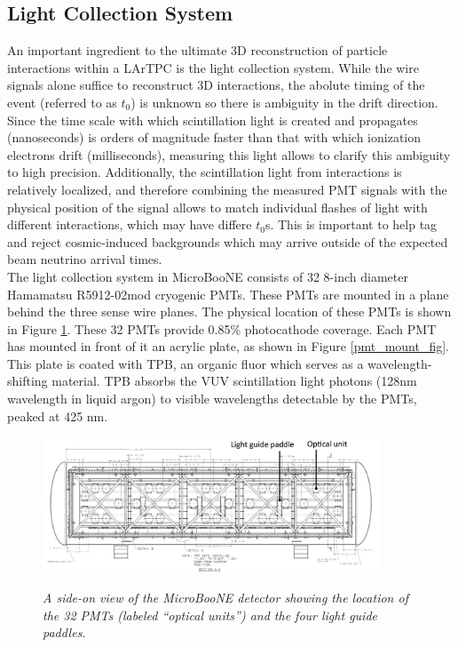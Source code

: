 \subsection{Light Collection System}
An important ingredient to the ultimate 3D reconstruction of particle interactions within a LArTPC is the light collection system. While the wire signals alone suffice to reconstruct 3D interactions, the abolute timing of the event (referred to as $t_0$) is unknown so there is ambiguity in the drift direction. Since the time scale with which scintillation light is created and propagates (nanoseconds) is orders of magnitude faster than that with which ionization electrons drift (milliseconds), measuring this light allows to clarify this ambiguity to high precision. Additionally, the scintillation light from interactions is relatively localized, and therefore combining the measured PMT signals with the physical position of the signal allows to match individual flashes of light with different interactions, which may have differe $t_0$s. This is important to help tag and reject cosmic-induced backgrounds which may arrive outside of the expected beam neutrino arrival times.\\

The light collection system in MicroBooNE consists of 32 8-inch diameter Hamamatsu R5912-02mod cryogenic PMTs. These PMTs are mounted in a plane behind the three sense wire planes. The physical location of these PMTs is shown in Figure \ref{pmt_placement_fig}. These 32 PMTs provide 0.85\% photocathode coverage. Each PMT has mounted in front of it an acrylic plate, as shown in Figure \ref{pmt_mount_fig}. This plate is coated with TPB, an organic fluor which serves as a wavelength-shifting material. TPB absorbs the VUV scintillation light photons (128nm wavelength in liquid argon) to visible wavelengths detectable by the PMTs, peaked at 425 nm.

\begin{figure}[ht!]
\centering
	\includegraphics[width=0.9\textwidth]{Figures/pmt_placement.png} \\
\caption{\textit{A side-on view of the MicroBooNE detector showing the location of the 32 PMTs (labeled ``optical units'') and the four light guide paddles.}}\label{pmt_placement_fig}
\end{figure}



